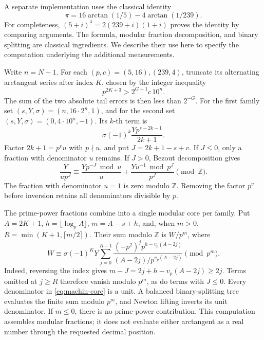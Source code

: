 \documentclass[11pt]{article}
\numberwithin{equation}{section}
\theoremstyle{definition}
\newcommand{\Z}{\mathbb Z}
\begin{document}
A separate implementation uses the classical identity
\begin{equation}\label{eq:machin-identity}
 \pi=16\arctan(1/5)-4\arctan(1/239).
\end{equation}
For completeness, $(5+i)^4=2(239+i)(1+i)$ proves the identity by
comparing arguments. The formula, modular fraction decomposition, and
binary splitting are classical ingredients. We describe their use here
to specify the computation underlying the additional measurements.

Write $n=N-1$. For each $(p,c)=(5,16),(239,4)$, truncate its alternating
arctangent series after index $K$, chosen by the integer inequality
\begin{equation}\label{eq:machin-cutoff}
 p^{2K+3}>2^{G+1}c\,10^n.
\end{equation}
The sum of the two absolute tail errors is then less than $2^{-G}$.
For the first family set $(s,Y,\sigma)=(n,16\cdot2^n,1)$, and for
the second set $(s,Y,\sigma)=(0,4\cdot10^n,-1)$. Its $k$-th term is
\[
 \sigma(-1)^k\frac{Yp^{s-2k-1}}{2k+1}.
\]
Factor $2k+1=p^v u$ with $p\nmid u$, and put $J=2k+1-s+v$.
If $J\le0$, only a fraction with denominator $u$ remains.
If $J>0$, Bezout decomposition gives
\begin{equation}\label{eq:machin-split}
 \frac{Y}{u p^J}\equiv
 \frac{Yp^{-J}\bmod u}{u}
 +\frac{Yu^{-1}\bmod p^J}{p^J}\pmod{\Z}.
\end{equation}
The fraction with denominator $u=1$ is zero modulo $\Z$.
Removing the factor $p^v$ before inversion retains all denominators
divisible by $p$.

The prime-power fractions combine into a single modular core per
family. Put $A=2K+1$, $h=\lfloor\log_p A\rfloor$, $m=A-s+h$,
and, when $m>0$, $R=\min(K+1,\lceil m/2\rceil)$.
Their sum modulo $\Z$ is $W/p^m$, where
\begin{equation}\label{eq:machin-core}
 W\equiv \sigma(-1)^K Y
 \sum_{j=0}^{R-1}
 \frac{(-p^2)^j p^{h-v_p(A-2j)}}
 {(A-2j)/p^{v_p(A-2j)}}\pmod{p^m}.
\end{equation}
Indeed, reversing the index gives
$m-J=2j+h-v_p(A-2j)\ge2j$. Terms omitted at $j\ge R$ therefore
vanish modulo $p^m$, as do terms with $J\le0$.
Every denominator in \eqref{eq:machin-core} is a unit. A balanced
binary-splitting tree evaluates the finite sum modulo $p^m$,
and Newton lifting inverts its unit denominator. If $m\le0$,
there is no prime-power contribution. This computation assembles
modular fractions; it does not evaluate either arctangent as a
real number through the requested decimal position.
\end{document}
